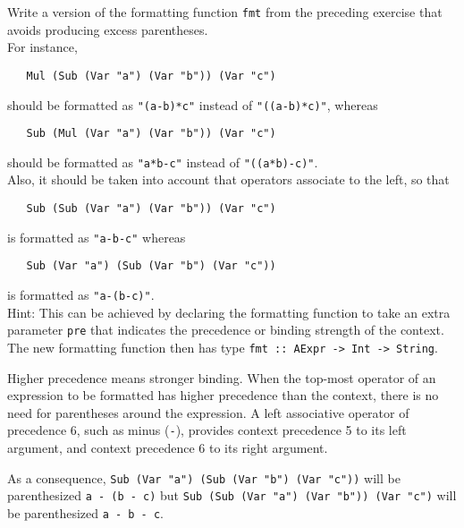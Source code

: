 \documentclass[a4paper]{article}
\begin{document}
\begin{exercise}\label{exer-better-fmt}
  Write a version of the formatting function \texttt{fmt} from the
preceding exercise that avoids producing excess parentheses.  \\

\noindent For instance,

{\codesetup\begin{verbatim}
   Mul (Sub (Var "a") (Var "b")) (Var "c")
\end{verbatim}}

\noindent    
should be formatted as \texttt{"(a-b)*c"} instead of
\texttt{"((a-b)*c)"}, whereas

{\codesetup\begin{verbatim}
   Sub (Mul (Var "a") (Var "b")) (Var "c")
\end{verbatim}}
    
\noindent    
should be formatted as \texttt{"a*b-c"} instead of
\texttt{"((a*b)-c)"}. \\

\noindent Also, it should be taken into account that
operators associate to the left, so that

{\codesetup\begin{verbatim}
   Sub (Sub (Var "a") (Var "b")) (Var "c") 
\end{verbatim}}

\noindent    
is formatted as \texttt{"a-b-c"} whereas

{\codesetup\begin{verbatim}
   Sub (Var "a") (Sub (Var "b") (Var "c"))
\end{verbatim}}

\noindent    
is formatted as \texttt{"a-(b-c)"}.\\
   
\noindent Hint: This can be achieved by declaring the formatting function to
take an extra parameter \texttt{pre} that indicates the precedence or
binding strength of the context.  The new formatting function then has
type \texttt{fmt ::\ AExpr -> Int -> String}.
  
Higher precedence means stronger binding.  When the top-most operator
of an expression to be formatted has higher precedence than the
context, there is no need for parentheses around the expression.  A
left associative operator of precedence 6, such as minus (\texttt{-}),
provides context precedence 5 to its left argument, and context
precedence 6 to its right argument.

As a consequence, \texttt{Sub (Var "a") (Sub (Var "b") (Var "c"))} will be
parenthesized \texttt{a - (b - c)} but \texttt{Sub (Sub (Var "a") (Var "b")) (Var "c")} will be parenthesized \texttt{a - b - c}.
\end{exercise}
\end{document}
